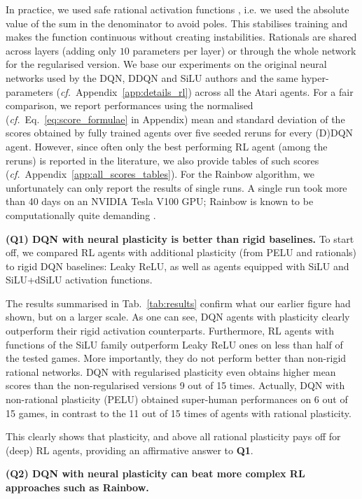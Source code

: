 \documentclass[accepted]{article}
\theoremstyle{plain}
\theoremstyle{definition}
\theoremstyle{remark}
\newcommand{\cf}{\emph{cf.}~}
\begin{document}
In practice, we used safe rational activation functions \citep{molina2019pad}, i.e. we used the absolute value of the sum in the denominator to avoid poles. 
This stabilises training and makes the function continuous without creating instabilities. Rationals are shared across layers (adding only $10$ parameters per layer) or through the whole network for the regularised version. We base our experiments on the original neural networks used by the DQN, DDQN and SiLU authors and the same hyper-parameters (\cf Appendix~\ref{app:details_rl}) across all the Atari agents.
For a fair comparison, we report performances using the normalised (\cf Eq.~\ref{eq:score_formulae} in Appendix) mean and standard deviation of the scores obtained by fully trained agents over five seeded reruns for every (D)DQN agent.  However, since often only the best performing RL agent (among the reruns) is reported in the literature, we also provide tables of such scores (\cf Appendix~\ref{app:all_scores_tables}). For the Rainbow algorithm, we unfortunately can only report the results of single runs. A single run took more than 40 days on an NVIDIA Tesla V100 GPU; Rainbow is known to be computationally quite demanding \citep{ObandoCeron2021RevisitingRP}.

{\bf (Q1) DQN with neural plasticity is better than rigid baselines.} 
To start off, we compared RL agents with additional plasticity (from PELU and rationals) to rigid DQN baselines: Leaky ReLU, as well as agents equipped with SiLU and SiLU+dSiLU activation functions.

The results summarised in Tab.~\ref{tab:results} confirm what our earlier figure had shown, but on a larger scale. As one can see, DQN agents with plasticity clearly outperform their rigid activation counterparts. Furthermore, RL agents with functions of the SiLU family outperform Leaky ReLU ones on less than half of the tested games. More importantly, they do not perform better than non-rigid rational networks. DQN with regularised plasticity even obtains higher mean scores than the non-regularised versions 9 out of 15 times. 
Actually, DQN with non-rational plasticity (PELU) obtained super-human performances on 6 out of 15 games, in contrast to the 11 out of 15 times of agents with rational plasticity.

This clearly shows that plasticity, and above all rational plasticity pays off for (deep) RL agents, providing an affirmative answer to \textbf{Q1}.


{\bf (Q2) DQN with neural plasticity can beat more complex RL approaches such as Rainbow.} 
\end{document}
